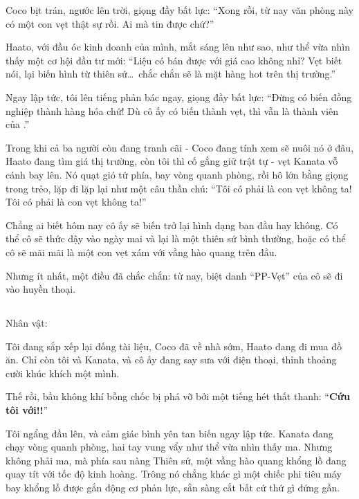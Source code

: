 \documentclass[../main.tex]{subfiles}
\begin{document}
Coco bịt trán, ngước lên trời, giọng đầy bất lực: ``Xong rồi, từ nay văn phòng này có một con vẹt thật sự rồi. Ai mà tin được chứ?''

Haato, với đầu óc kinh doanh của mình, mắt sáng lên như sao, như thể vừa nhìn thấy một cơ hội đầu tư mới: ``Liệu có bán được với giá cao không nhỉ? Vẹt biết nói, lại biến hình từ thiên sứ\dots\ chắc chắn sẽ là mặt hàng hot trên thị trường.''

Ngay lập tức, tôi lên tiếng phản bác ngay, giọng đầy bất lực: ``Đừng có biến đồng nghiệp thành hàng hóa chứ! Dù cô ấy có biến thành vẹt, thì vẫn là thành viên của \hll.''

Trong khi cả ba người còn đang tranh cãi - Coco đang tính xem sẽ nuôi nó ở đâu, Haato đang tìm giá thị trường, còn tôi thì cố gắng giữ trật tự - vẹt Kanata vỗ cánh bay lên. Nó quạt gió tứ phía, bay vòng quanh phòng, rồi hô lớn bằng giọng trong trẻo, lặp đi lặp lại như một câu thần chú: ``Tôi có phải là con vẹt không ta! Tôi có phải là con vẹt không ta!''

Chẳng ai biết hôm nay cô ấy sẽ biến trở lại hình dạng ban đầu hay không. Có thể cô sẽ thức dậy vào ngày mai và lại là một thiên sứ bình thường, hoặc có thể cô sẽ mãi mãi là một con vẹt xám với vầng hào quang trên đầu.

Nhưng ít nhất, một điều đã chắc chắn: từ nay, biệt danh ``PP-Vẹt'' của cô sẽ đi vào huyền thoại.

\newpage

\subsection*{\label{ep-S7.III}}
\vspace{-4pt}
\begin{center}
  {\caviar\fontsize{12pt}{12pt}\selectfont Nhân vật:    }
\end{center}

Tôi đang sắp xếp lại đống tài liệu, Coco đã về nhà sớm, Haato đang đi mua đồ ăn. Chỉ còn tôi và Kanata, và cô ấy đang say sưa với điện thoại, thỉnh thoảng cười khúc khích một mình.

Thế rồi, bầu không khí bỗng chốc bị phá vỡ bởi một tiếng hét thất thanh: ``\textbf{Cứu tôi với!!}''

Tôi ngẩng đầu lên, và cảm giác bình yên tan biến ngay lập tức. Kanata đang chạy vòng quanh phòng, hai tay vung vẩy như thể vừa nhìn thấy ma. Nhưng không phải ma, mà phía sau nàng Thiên sứ, một vầng hào quang khổng lồ đang quay tít với tốc độ kinh hoàng. Trông nó chẳng khác gì một chiếc phi tiêu máy bay khổng lồ được gắn động cơ phản lực, sẵn sàng cắt bất cứ thứ gì đứng gần.
\end{document}
